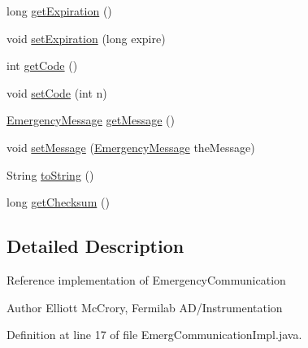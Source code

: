 \begin{DoxyCompactItemize}
long \hyperlink{classgov_1_1fnal_1_1ppd_1_1dd_1_1emergency_1_1EmergCommunicationImpl_ab232b4e07d053e1f92801c62f80d0fed}{get\-Expiration} ()
\item 
void \hyperlink{classgov_1_1fnal_1_1ppd_1_1dd_1_1emergency_1_1EmergCommunicationImpl_aa355b690547d8073523804141988b532}{set\-Expiration} (long expire)
\item 
int \hyperlink{classgov_1_1fnal_1_1ppd_1_1dd_1_1emergency_1_1EmergCommunicationImpl_afcf5791a5c549b60452054993bd9b9b0}{get\-Code} ()
\item 
void \hyperlink{classgov_1_1fnal_1_1ppd_1_1dd_1_1emergency_1_1EmergCommunicationImpl_a396b9a2b1c18c674754bdeb7aad40baf}{set\-Code} (int n)
\item 
\hyperlink{classgov_1_1fnal_1_1ppd_1_1dd_1_1emergency_1_1EmergencyMessage}{Emergency\-Message} \hyperlink{classgov_1_1fnal_1_1ppd_1_1dd_1_1emergency_1_1EmergCommunicationImpl_af720ed2e88d16f3eda6bae2496a131e1}{get\-Message} ()
\item 
void \hyperlink{classgov_1_1fnal_1_1ppd_1_1dd_1_1emergency_1_1EmergCommunicationImpl_af5e7673310b2af5eb678f6f14774392a}{set\-Message} (\hyperlink{classgov_1_1fnal_1_1ppd_1_1dd_1_1emergency_1_1EmergencyMessage}{Emergency\-Message} the\-Message)
\item 
String \hyperlink{classgov_1_1fnal_1_1ppd_1_1dd_1_1emergency_1_1EmergCommunicationImpl_a765a6a94a1acb80fc761e0168167c0ba}{to\-String} ()
\item 
long \hyperlink{classgov_1_1fnal_1_1ppd_1_1dd_1_1emergency_1_1EmergCommunicationImpl_af6031cc896aab247e2f620410b55110e}{get\-Checksum} ()
\end{DoxyCompactItemize}


\subsection{Detailed Description}
Reference implementation of Emergency\-Communication

\begin{DoxyAuthor}{Author}
Elliott Mc\-Crory, Fermilab A\-D/\-Instrumentation 
\end{DoxyAuthor}


Definition at line 17 of file Emerg\-Communication\-Impl.\-java.



